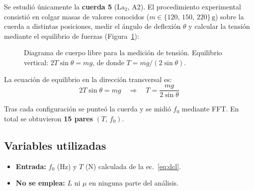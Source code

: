 \documentclass[12pt,a4paper]{article}
\begin{document}
Se estudió únicamente la \textbf{cuerda 5} (La$_2$, A2). El procedimiento
experimental consistió en colgar masas de valores conocidos ($m \in
\{120,\,150,\,220\}\,\text{g}$) sobre la cuerda a distintas posiciones,
medir el ángulo de deflexión $\theta$ y calcular la tensión mediante el
equilibrio de fuerzas (Figura~\ref{fig:dcl}):

\begin{figure}[H]
\centering
{}
\caption{Diagrama de cuerpo libre para la medición de tensión.
  Equilibrio vertical: $2T\sin\theta = mg$, de donde $T = mg/(2\sin\theta)$.}
\label{fig:dcl}
\end{figure}

\noindent La ecuación de equilibrio en la dirección transversal es:
\begin{equation}
  2T\sin\theta = mg
  \quad\Longrightarrow\quad
  \boxed{T = \frac{mg}{2\sin\theta}}
  \label{eq:dcl}
\end{equation}

Tras cada configuración se punteó la cuerda y se midió $f_0$ mediante FFT.
En total se obtuvieron \textbf{15 pares} $(T,\,f_0)$.

\subsection{Variables utilizadas}

\begin{itemize}
  \item \textbf{Entrada:} $f_0$ (Hz) y $T$ (N) calculada de la ec.~\eqref{eq:dcl}.
  \item \textbf{No se emplea:} $L$ ni $\mu$ en ninguna parte del análisis.
\end{itemize}
\end{document}

